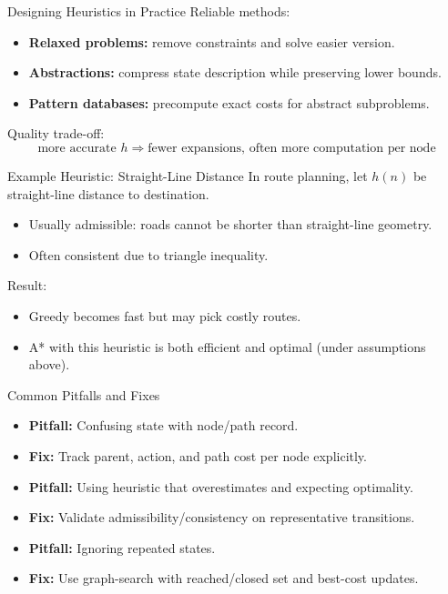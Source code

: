 \documentclass[10pt]{beamer}
\begin{document}
\begin{frame}{Designing Heuristics in Practice}
    Reliable methods:
    \begin{itemize}
        \item \textbf{Relaxed problems:} remove constraints and solve easier version.
        \item \textbf{Abstractions:} compress state description while preserving lower bounds.
        \item \textbf{Pattern databases:} precompute exact costs for abstract subproblems.
    \end{itemize}
    \vspace{0.2cm}
    Quality trade-off:
    \[
        \text{more accurate } h \Rightarrow \text{fewer expansions, often more computation per node}
    \]
\end{frame}

\begin{frame}{Example Heuristic: Straight-Line Distance}
    In route planning, let $h(n)$ be straight-line distance to destination.
    \begin{itemize}
        \item Usually admissible: roads cannot be shorter than straight-line geometry.
        \item Often consistent due to triangle inequality.
    \end{itemize}
    \vspace{0.2cm}
    Result:
    \begin{itemize}
        \item Greedy becomes fast but may pick costly routes.
        \item A* with this heuristic is both efficient and optimal (under assumptions above).
    \end{itemize}
\end{frame}

\begin{frame}{Common Pitfalls and Fixes}
    \begin{itemize}
        \item \textbf{Pitfall:} Confusing state with node/path record.
        \item \textbf{Fix:} Track parent, action, and path cost per node explicitly.

        \item \textbf{Pitfall:} Using heuristic that overestimates and expecting optimality.
        \item \textbf{Fix:} Validate admissibility/consistency on representative transitions.

        \item \textbf{Pitfall:} Ignoring repeated states.
        \item \textbf{Fix:} Use graph-search with reached/closed set and best-cost updates.
    \end{itemize}
\end{frame}
\end{document}
